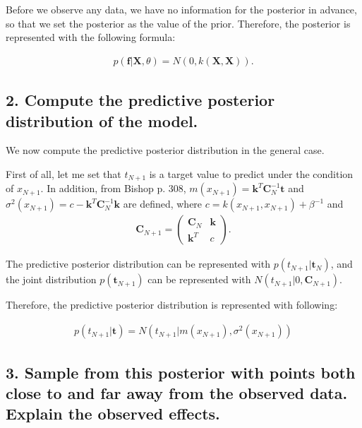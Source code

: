 \documentclass[12pt,letterpaper]{article}
\begin{document}
Before we observe any data,
we have no information for the posterior in advance,
so that we set the posterior as the value of the prior.
Therefore, the posterior is represented with the following formula:

\begin{equation}
\begin{split}
p(\textbf{f}|\textbf{X}, \theta) = 
N (0, k(\textbf{X}, \textbf{X})).
\end{split}
\end{equation}


\subsection*{2. Compute the predictive posterior distribution of the model.}

We now compute the predictive posterior distribution in the general case.

First of all, let me set that
$t_{N+1}$ is a target value to predict under the condition of $x_{N+1}$.
In addition, from Bishop p. 308,
$m(x_{N+1})=\textbf{k}^T \textbf{C}_N^{-1} \textbf{t}$ and
$\sigma^2(x_{N+1}) = c-\textbf{k}^T \textbf{C}_N^{-1} \textbf{k}$
are defined,
where $c = k(x_{N+1},x_{N+1}) + \beta^{-1}$ and
\begin{equation}
\begin{split}
\textbf{C}_{N+1}=\left(
    \begin{array}{cc}
      \textbf{C}_N & \textbf{k} \\
      \textbf{k}^T & c
    \end{array}
  \right).
\end{split}
\end{equation}


The predictive posterior distribution can be represented with $p(t_{N+1}|\textbf{t}_N)$,
and the joint distribution $p(\textbf{t}_{N+1})$ can be represented with
$N(t_{N+1}|0, \textbf{C}_{N+1})$.

Therefore, the predictive posterior distribution is represented with following:

\begin{equation}
\begin{split}
p(t_{N+1}|\textbf{t}) = N(t_{N+1}|m(x_{N+1}), \sigma^2(x_{N+1}))
\end{split}
\end{equation}



\subsection*{3. Sample from this posterior with points both close to and far away from the observed data. Explain the observed effects.}
\end{document}
